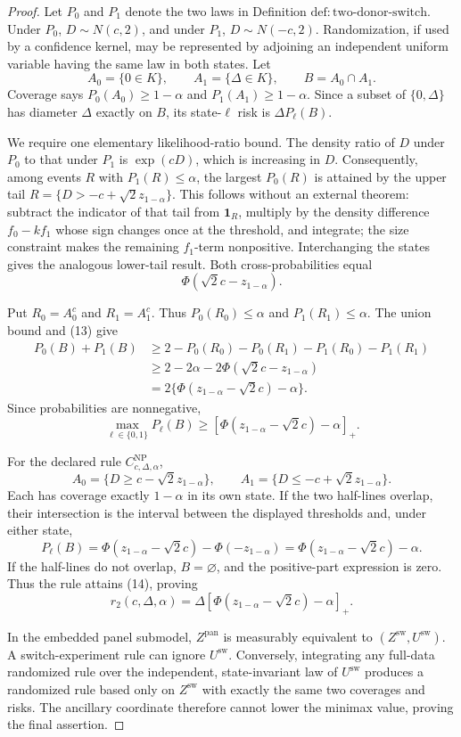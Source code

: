 \documentclass{article}
\begin{document}
\begin{proof}
Let \(P_0\) and \(P_1\) denote the two laws in Definition \(\mathrm{def:two\text{-}donor\text{-}switch}\).  Under \(P_0\), \(D\sim N(c,2)\), and under \(P_1\), \(D\sim N(-c,2)\).  Randomization, if used by a confidence kernel, may be represented by adjoining an independent uniform variable having the same law in both states.  Let
\[
 A_0=\{0\in K\},\qquad A_1=\{\Delta\in K\},
 \qquad B=A_0\cap A_1.
\]
Coverage says \(P_0(A_0)\ge1-\alpha\) and \(P_1(A_1)\ge1-\alpha\).  Since a subset of \(\{0,\Delta\}\) has diameter \(\Delta\) exactly on \(B\), its state-\(\ell\) risk is \(\Delta P_\ell(B)\).

We require one elementary likelihood-ratio bound.  The density ratio of \(D\) under \(P_0\) to that under \(P_1\) is \(\exp(cD)\), which is increasing in \(D\).  Consequently, among events \(R\) with \(P_1(R)\le\alpha\), the largest \(P_0(R)\) is attained by the upper tail
\(
 R=\{D>-c+\sqrt2z_{1-\alpha}\}
\).
This follows without an external theorem: subtract the indicator of that tail from \(\mathbf1_R\), multiply by the density difference \(f_0-kf_1\) whose sign changes once at the threshold, and integrate; the size constraint makes the remaining \(f_1\)-term nonpositive.  Interchanging the states gives the analogous lower-tail result.  Both cross-probabilities equal
\[
 \Phi(\sqrt2c-z_{1-\alpha}).
\tag{13}
\]

Put \(R_0=A_0^c\) and \(R_1=A_1^c\).  Thus \(P_0(R_0)\le\alpha\) and \(P_1(R_1)\le\alpha\).  The union bound and (13) give
\[
\begin{aligned}
 P_0(B)+P_1(B)
 &\ge2-P_0(R_0)-P_0(R_1)-P_1(R_0)-P_1(R_1)\\
 &\ge2-2\alpha-2\Phi(\sqrt2c-z_{1-\alpha})\\
 &=2\{\Phi(z_{1-\alpha}-\sqrt2c)-\alpha\}.
\end{aligned}
\]
Since probabilities are nonnegative,
\[
 \max_{\ell\in\{0,1\}}P_\ell(B)
 \ge[\Phi(z_{1-\alpha}-\sqrt2c)-\alpha]_+.
\tag{14}
\]

For the declared rule \(C^{\mathrm{NP}}_{c,\Delta,\alpha}\),
\[
 A_0=\{D\ge c-\sqrt2z_{1-\alpha}\},
 \qquad
 A_1=\{D\le-c+\sqrt2z_{1-\alpha}\}.
\]
Each has coverage exactly \(1-\alpha\) in its own state.  If the two half-lines overlap, their intersection is the interval between the displayed thresholds and, under either state,
\[
 P_\ell(B)=\Phi(z_{1-\alpha}-\sqrt2c)-\Phi(-z_{1-\alpha})
 =\Phi(z_{1-\alpha}-\sqrt2c)-\alpha.
\]
If the half-lines do not overlap, \(B=\varnothing\), and the positive-part expression is zero.  Thus the rule attains (14), proving
\[
 r_2(c,\Delta,\alpha)
 =\Delta[\Phi(z_{1-\alpha}-\sqrt2c)-\alpha]_+.
\]

In the embedded panel submodel, \(Z^{\mathrm{pan}}\) is measurably equivalent to \((Z^{\mathrm{sw}},U^{\mathrm{sw}})\).  A switch-experiment rule can ignore \(U^{\mathrm{sw}}\).  Conversely, integrating any full-data randomized rule over the independent, state-invariant law of \(U^{\mathrm{sw}}\) produces a randomized rule based only on \(Z^{\mathrm{sw}}\) with exactly the same two coverages and risks.  The ancillary coordinate therefore cannot lower the minimax value, proving the final assertion.
\end{proof}
\end{document}
